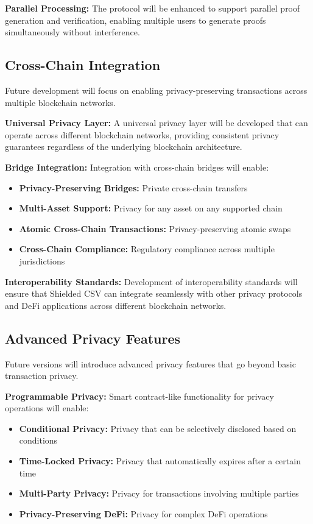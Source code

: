 \documentclass[11pt,a4paper]{article}
\begin{document}
\textbf{Parallel Processing:}
The protocol will be enhanced to support parallel proof generation and verification, enabling multiple users to generate proofs simultaneously without interference.

\subsection{Cross-Chain Integration}

Future development will focus on enabling privacy-preserving transactions across multiple blockchain networks.

\textbf{Universal Privacy Layer:}
A universal privacy layer will be developed that can operate across different blockchain networks, providing consistent privacy guarantees regardless of the underlying blockchain architecture.

\textbf{Bridge Integration:}
Integration with cross-chain bridges will enable:
\begin{itemize}
    \item \textbf{Privacy-Preserving Bridges:} Private cross-chain transfers
    \item \textbf{Multi-Asset Support:} Privacy for any asset on any supported chain
    \item \textbf{Atomic Cross-Chain Transactions:} Privacy-preserving atomic swaps
    \item \textbf{Cross-Chain Compliance:} Regulatory compliance across multiple jurisdictions
\end{itemize}

\textbf{Interoperability Standards:}
Development of interoperability standards will ensure that Shielded CSV can integrate seamlessly with other privacy protocols and DeFi applications across different blockchain networks.

\subsection{Advanced Privacy Features}

Future versions will introduce advanced privacy features that go beyond basic transaction privacy.

\textbf{Programmable Privacy:}
Smart contract-like functionality for privacy operations will enable:
\begin{itemize}
    \item \textbf{Conditional Privacy:} Privacy that can be selectively disclosed based on conditions
    \item \textbf{Time-Locked Privacy:} Privacy that automatically expires after a certain time
    \item \textbf{Multi-Party Privacy:} Privacy for transactions involving multiple parties
    \item \textbf{Privacy-Preserving DeFi:} Privacy for complex DeFi operations
\end{itemize}
\end{document}
